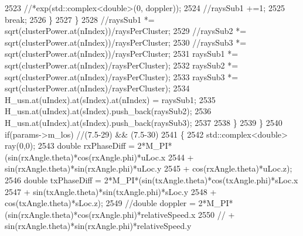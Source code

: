 \begin{DoxyCode}
2523                                                                 \textcolor{comment}{//*exp(std::complex<double>(0, doppler));}
2524                                                         \textcolor{comment}{//raysSub1 +=1;}
2525                                                         \textcolor{keywordflow}{break};
2526                                                 \}
2527                                         \}
2528                                         \textcolor{comment}{//raysSub1 *= sqrt(clusterPower.at(nIndex))/raysPerCluster;}
2529                                         \textcolor{comment}{//raysSub2 *= sqrt(clusterPower.at(nIndex))/raysPerCluster;}
2530                                         \textcolor{comment}{//raysSub3 *= sqrt(clusterPower.at(nIndex))/raysPerCluster;}
2531                                         raysSub1 *= sqrt(clusterPower.at(nIndex)/raysPerCluster);
2532                                         raysSub2 *= sqrt(clusterPower.at(nIndex)/raysPerCluster);
2533                                         raysSub3 *= sqrt(clusterPower.at(nIndex)/raysPerCluster);
2534                                         H\_usn.at(uIndex).at(sIndex).at(nIndex) = raysSub1;
2535                                         H\_usn.at(uIndex).at(sIndex).push\_back(raysSub2);
2536                                         H\_usn.at(uIndex).at(sIndex).push\_back(raysSub3);
2537 
2538                                 \}
2539                         \}
2540                         \textcolor{keywordflow}{if}(params->m\_los) \textcolor{comment}{//(7.5-29) && (7.5-30)}
2541                         \{
2542                                 std::complex<double> ray(0,0);
2543                                 \textcolor{keywordtype}{double} rxPhaseDiff = 2*M\_PI*(sin(rxAngle.theta)*cos(rxAngle.phi)*uLoc.x
2544                                                 + sin(rxAngle.theta)*sin(rxAngle.phi)*uLoc.y
2545                                                 + cos(rxAngle.theta)*uLoc.z);
2546                                 \textcolor{keywordtype}{double} txPhaseDiff = 2*M\_PI*(sin(txAngle.theta)*cos(txAngle.phi)*sLoc.x
2547                                                 + sin(txAngle.theta)*sin(txAngle.phi)*sLoc.y
2548                                                 + cos(txAngle.theta)*sLoc.z);
2549                                 \textcolor{comment}{//double doppler =
       2*M\_PI*(sin(rxAngle.theta)*cos(rxAngle.phi)*relativeSpeed.x}
2550                                 \textcolor{comment}{//              + sin(rxAngle.theta)*sin(rxAngle.phi)*relativeSpeed.y}

\end{DoxyCode}
